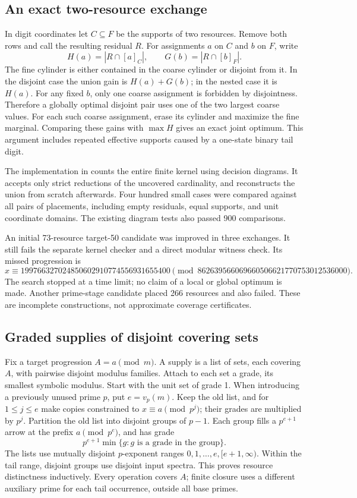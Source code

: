 \documentclass[11pt]{article}
\begin{document}
\subsection{An exact two-resource exchange}
In digit coordinates let $C\subseteq F$ be the supports of two resources.
Remove both rows and call the resulting residual $R$. For assignments $a$
on $C$ and $b$ on $F$, write
\[
 H(a)=|R\cap[a]_C|,\qquad G(b)=|R\cap[b]_F|.
\]
The fine cylinder is either contained in the coarse cylinder or disjoint
from it. In the disjoint case the union gain is $H(a)+G(b)$; in the nested
case it is $H(a)$. For any fixed $b$, only one coarse assignment is forbidden
by disjointness. Therefore a globally optimal disjoint pair uses one of the
two largest coarse values. For each such coarse assignment, erase its
cylinder and maximize the fine marginal. Comparing these gains with
$\max H$ gives an exact joint optimum. This argument includes repeated
effective supports caused by a one-state binary tail digit.

The implementation in  counts the
entire finite kernel using decision diagrams. It accepts only strict
reductions of the uncovered cardinality, and reconstructs the union from
scratch afterwards. Four hundred small cases were compared against all
pairs of placements, including empty residuals, equal supports, and unit
coordinate domains. The existing diagram tests also passed 900 comparisons.

An initial 73-resource target-50 candidate was improved in three exchanges.
It still fails the separate kernel checker and a direct modular witness
check. Its missed progression is
\[
 x\equiv199766327024850602910774556931655400
 \pmod{862639566069660506621770753012536000}.
\]
The search stopped at a time limit; no claim of a local or global optimum
is made. Another prime-stage candidate placed 266 resources and also failed.
These are incomplete constructions, not approximate coverage certificates.

\subsection{Graded supplies of disjoint covering sets}
Fix a target progression $A=a\pmod m$. A supply is a list of sets, each
covering $A$, with pairwise disjoint modulus families. Attach to each set
a grade, its smallest symbolic modulus. Start with the unit set of grade 1.
When introducing a previously unused prime $p$, put $e=v_p(m)$. Keep the
old list, and for $1\leq j\leq e$ make copies constrained to
$x\equiv a\pmod{p^j}$; their grades are multiplied by $p^j$. Partition the
old list into disjoint groups of $p-1$. Each group fills a $p^{e+1}$ arrow
at the prefix $a\pmod{p^e}$, and has grade
\[
 p^{e+1}\min\{g:g\text{ is a grade in the group}\}.
\]
The lists use mutually disjoint $p$-exponent ranges
$0,1,\ldots,e,[e+1,\infty)$. Within the tail range, disjoint groups use
disjoint input spectra. This proves resource distinctness inductively.
Every operation covers $A$; finite closure uses a different auxiliary
prime for each tail occurrence, outside all base primes.
\end{document}
